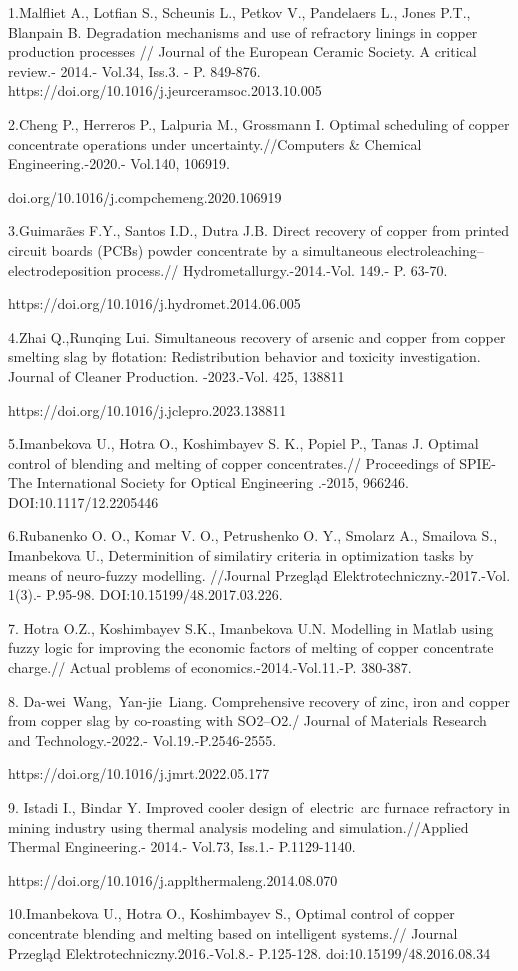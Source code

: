 \begin{noparindent}
1.Malfliet A., Lotfian S., Scheunis L., Petkov V., Pandelaers L., Jones
P.T., Blanpain B. Degradation mechanisms and use of refractory linings
in copper production processes // Journal of the European Ceramic
Society. A critical review.- 2014.- Vol.34, Iss.3. - P. 849-876.
https://doi.org/10.1016/j.jeurceramsoc.2013.10.005

2.Cheng P., Herreros P., Lalpuria M., Grossmann I. Optimal scheduling of
copper concentrate operations under uncertainty.//Computers \& Chemical
Engineering.-2020.- Vol.140, 106919.

doi.org/10.1016/j.compchemeng.2020.106919

3.Guimarães F.Y., Santos I.D., Dutra J.B. Direct recovery of copper from
printed circuit boards (PCBs) powder concentrate by a simultaneous
electroleaching--electrodeposition process.//
Hydrometallurgy.-2014.-Vol. 149.- P. 63-70.

https://doi.org/10.1016/j.hydromet.2014.06.005

4.Zhai Q.,Runqing Lui. Simultaneous recovery of arsenic and copper from
copper smelting slag by flotation: Redistribution behavior and toxicity
investigation. Journal of Cleaner Production. -2023.-Vol. 425, 138811

https://doi.org/10.1016/j.jclepro.2023.138811

5.Imanbekova U., Hotra O., Koshimbayev S. K., Popiel P., Tanas J.
Optimal control of blending and melting of copper concentrates.//
Proceedings of SPIE-The International Society for Optical Engineering
.-2015, 966246. DOI:10.1117/12.2205446

6.Rubanenko O. O., Komar V. O., Petrushenko O. Y., Smolarz A., Smailova
S., Imanbekova U., Determinition of similatiry criteria in optimization
tasks by means of neuro-fuzzy modelling. //Journal Przegląd
Elektrotechniczny.-2017.-Vol. 1(3).- P.95-98.
DOI:10.15199/48.2017.03.226.

7. Hotra O.Z., Koshimbayev S.K., Imanbekova U.N. Modelling in Matlab
using fuzzy logic for improving the economic factors of melting of
copper concentrate charge.// Actual problems of
economics.-2014.-Vol.11.-P. 380-387.

8. Da-wei~Wang,~Yan-jie~Liang. Comprehensive recovery of zinc, iron and
copper from copper slag by co-roasting with SO2--O2./ Journal of
Materials Research and Technology.-2022.- Vol.19.-P.2546-2555.

https://doi.org/10.1016/j.jmrt.2022.05.177

9. Istadi I., Bindar Y. Improved cooler design of~electric~arc furnace
refractory in mining industry using thermal analysis modeling and
simulation.//Applied Thermal Engineering.- 2014.- Vol.73, Iss.1.-
P.1129-1140.

https://doi.org/10.1016/j.applthermaleng.2014.08.070

10.Imanbekova U., Hotra O., Koshimbayev S., Optimal control of copper
concentrate blending and melting based on intelligent systems.// Journal
Przegląd Elektrotechniczny.2016.-Vol.8.- P.125-128.
doi:10.15199/48.2016.08.34
\end{noparindent}


